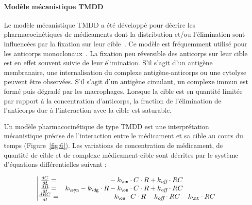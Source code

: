 \paragraph{Modèle mécanistique TMDD} Le modèle mécanistique TMDD a été développé pour décrire les pharmacocinétiques de médicaments dont la distribution et/ou l'élimination sont influencées par la fixation sur leur cible~\citep{REF3}. Ce modèle est fréquemment utilisé pour les anticorps monoclonaux~\citep{REF4}. La fixation peu réversible des anticorps sur leur cible est en effet souvent suivie de leur élimination. S'il s'agit d'un antigène membranaire, une internalisation du complexe antigène-anticorps ou une cytolyse peuvent être observées. S'il s'agit d'un antigène circulant, un complexe immun est formé puis dégradé par les macrophages. Lorsque la cible est en quantité limitée par rapport à la concentration d'anticorps, la fraction de l'élimination de l'anticorps due à l'interaction avec la cible est saturable.

Un modèle pharmacocinétique de type TMDD est une interprétation mécanistique précise de l'interaction entre le médicament et sa cible au cours du temps (Figure~\ref{fig:6}). Les variations de concentration de médicament, de quantité de cible et de complexe médicament-cible sont décrites par le système d'équations différentielles suivant :

\begin{equation}
\left| \begin{matrix}
\frac{dC}{dt}=& \phantom{k_{\syn} - k_{\dg}\cdot R} - k_{\on} \cdot C \cdot R + k_{\off} \cdot RC\phantom{ - k_{\nt} \cdot RC}\\ 
\frac{dR}{dt}=&          k_{\syn} - k_{\dg}\cdot R  - k_{\on} \cdot C \cdot R + k_{\off} \cdot RC\phantom{ - k_{\nt} \cdot RC}\\ 
\frac{dRC}{dt}=&\phantom{k_{\syn} - k_{\dg}\cdot R - }k_{\on} \cdot C \cdot R - k_{\off} \cdot RC - k_{\nt} \cdot RC\\ 
\end{matrix}\right.
\label{eq:33}
\end{equation}

